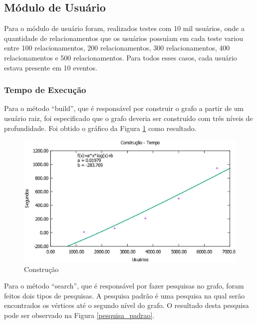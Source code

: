 \subsection{Módulo de Usuário}

Para o módulo de usuário foram, realizados testes com 10 mil usuários, onde a quantidade de relacionamentos que os usuários possuíam em cada teste variou entre 100 relacionamentos, 200 relacionamentos, 300 relacionamentos, 400 relacionamentos e 500 relacionamentos. Para todos esses casos, cada usuário estava presente em 10 eventos.

\subsubsection{Tempo de Execução}

Para o método ``build'', que é responsável por construir o grafo a partir de um usuário raiz, foi especificado que o grafo deveria ser construído com três níveis de profundidade. Foi obtido o gráfico da Figura \ref{build_tempo} como resultado.

\begin{figure}[!h]
	\centering
	\includegraphics[scale=0.55]{figuras/resultados/graficos/construcao_tempo.eps}
	\caption[Construção]{Construção}
	\label{build_tempo}
\end{figure}

Para o método ``search'', que é responsável por fazer pesquisas no grafo, foram feitos dois tipos de pesquisas. A pesquisa padrão é uma pesquisa na qual serão encontrados os vértices até o segundo nível do grafo. O resultado desta pesquisa pode ser observado na Figura \ref{pesquisa_padrao}.

